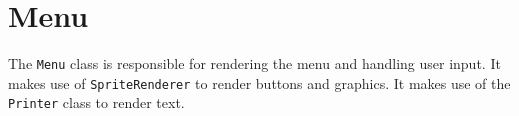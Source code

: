 \section{Menu}
The \texttt{Menu} class is responsible for rendering the menu and handling user input.
It makes use of \texttt{SpriteRenderer} to render buttons and graphics.
It makes use of the \texttt{Printer} class to render text.